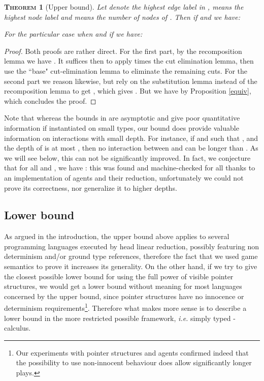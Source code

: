 \documentclass{article}
\newtheorem{theorem}{\textsc{Theorem}}
\begin{document}
\begin{theorem}[Upper bound]
Let  denote the highest edge label in ,  means the highest node label and  means the number of nodes of . Then if  and  we have:

For the particular case when  and if  we have:

\end{theorem}
\begin{proof}
Both proofs are rather direct. For the first part, by the recomposition lemma we have . It suffices then to apply  times
the cut elimination lemma, then use the ``base" cut-elimination lemma to eliminate the remaining cuts. For the second part we reason likewise, but rely on the substitution lemma instead of the recomposition
lemma to get , which gives . But we have  by Proposition \ref{equiv}, which concludes the proof.
\end{proof}

Note that whereas the bounds in \cite{beckmann2001exact} are asymptotic and give poor quantitative information if instantiated on small types, our bound does provide valuable information on interactions with
small depth. For instance, if  and  such that ,
 and the depth of  is at most , then no interaction between  and  can be longer than . As we will see below, this can not be significantly improved.
In fact, we conjecture that for all  and , we have  : this was found and machine-checked for all  thanks to an implementation of agents and their
reduction, unfortunately we could not prove its correctness, nor generalize it to higher depths.


\subsection{Lower bound}

As argued in the introduction, the upper bound above applies to several programming languages executed by head linear reduction, possibly featuring non determinism and/or ground type references, therefore the fact that
we used game semantics to prove it increases its generality. On the other hand, if we try to give the closest possible lower bound for  using the full power of visible pointer structures, we would get a lower
bound without meaning for most languages concerned by the upper bound, since pointer structures have no innocence or determinism requirements\footnote{Our experiments with pointer structures and agents confirmed indeed that the
possibility to use non-innocent behaviour does allow significantly longer plays.}. Therefore what makes more sense is to describe a lower bound in the more restricted possible framework, \emph{i.e.}
simply typed -calculus.
\end{document}
